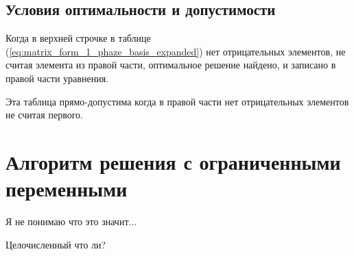 \documentclass[a4paper,article,14pt]{extarticle}
\begin{document}
\subsection{Условия оптимальности и допустимости}

Когда в верхней строчке в таблице (\ref{eq:matrix_form_1_phaze_basis_expanded}) нет отрицательных элементов, не считая элемента из правой части, оптимальное решение найдено, и записано в правой части уравнения.

Эта таблица прямо-допустима когда в правой части нет отрицательных элементов не считая первого.

\section{Алгоритм решения с ограниченными переменными}

Я не понимаю что это значит...

Целочисленный что ли?
\end{document}
